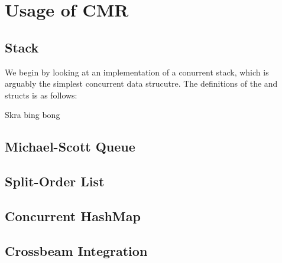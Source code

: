 \chapter{Usage of CMR}
\blindtext{}

\section{Stack}

We begin by looking at an implementation of a conurrent stack, which is arguably the simplest
concurrent data strucutre. The definitions of the  and  structs is as
follows:


Skra bing bong
\begin{figure}[ht]

\end{figure}

\section{Michael-Scott Queue}
\blindtext{}

\section{Split-Order List}
\blindtext{}

\section{Concurrent HashMap}
\blindtext{}

\section{Crossbeam Integration}
\blindtext{}
